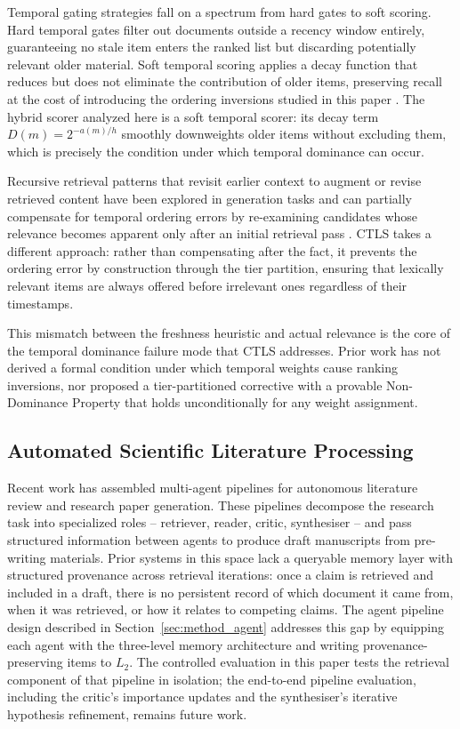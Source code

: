 Temporal gating strategies fall on a spectrum from hard gates to soft scoring. Hard temporal gates filter out documents outside a recency window entirely, guaranteeing no stale item enters the ranked list but discarding potentially relevant older material. Soft temporal scoring applies a decay function that reduces but does not eliminate the contribution of older items, preserving recall at the cost of introducing the ordering inversions studied in this paper \citep{ref_temporal_hard_soft_gate}. The hybrid scorer analyzed here is a soft temporal scorer: its decay term $D(m) = 2^{-a(m)/h}$ smoothly downweights older items without excluding them, which is precisely the condition under which temporal dominance can occur.

Recursive retrieval patterns that revisit earlier context to augment or revise retrieved content have been explored in generation tasks and can partially compensate for temporal ordering errors by re-examining candidates whose relevance becomes apparent only after an initial retrieval pass \citep{ref_re3_retrospective_retrieval}. CTLS takes a different approach: rather than compensating after the fact, it prevents the ordering error by construction through the tier partition, ensuring that lexically relevant items are always offered before irrelevant ones regardless of their timestamps.

This mismatch between the freshness heuristic and actual relevance is the core of the temporal dominance failure mode that CTLS addresses. Prior work has not derived a formal condition under which temporal weights cause ranking inversions, nor proposed a tier-partitioned corrective with a provable Non-Dominance Property that holds unconditionally for any weight assignment.

\subsection{Automated Scientific Literature Processing}

Recent work has assembled multi-agent pipelines for autonomous literature review and research paper generation. These pipelines decompose the research task into specialized roles -- retriever, reader, critic, synthesiser -- and pass structured information between agents to produce draft manuscripts from pre-writing materials. Prior systems in this space lack a queryable memory layer with structured provenance across retrieval iterations: once a claim is retrieved and included in a draft, there is no persistent record of which document it came from, when it was retrieved, or how it relates to competing claims. The agent pipeline design described in Section~\ref{sec:method_agent} addresses this gap by equipping each agent with the three-level memory architecture and writing provenance-preserving items to $L_2$. The controlled evaluation in this paper tests the retrieval component of that pipeline in isolation; the end-to-end pipeline evaluation, including the critic's importance updates and the synthesiser's iterative hypothesis refinement, remains future work.



